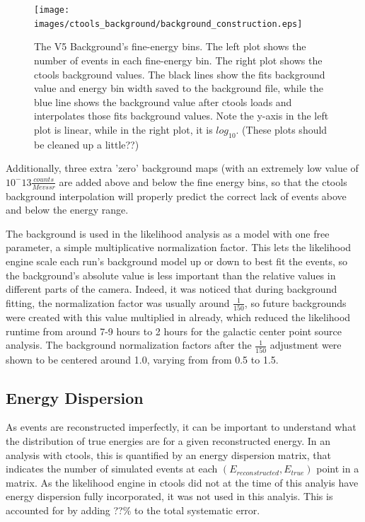 \begin{figure}[ht]
  \begin{center}
    \texttt{[image: images/ctools\_background/background\_construction.eps]}
    \caption[CTOOLS Background Fine Energy Bins]{The V5 Background's fine-energy bins.  The left plot shows the number of events in each fine-energy bin.  The right plot shows the ctools background values.  The black lines show the fits background value and energy bin width saved to the background file, while the blue line shows the background value after ctools loads and interpolates those fits background values.  Note the y-axis in the left plot is linear, while in the right plot, it is $log_{10}$. (These plots should be cleaned up a little??)}\label{fig:background_profile}
  \end{center}
\end{figure}

Additionally, three extra 'zero' background maps (with an extremely low value of $10^-13 \frac{counts}{Mev s sr}$ are added above and below the fine energy bins, so that the ctools background interpolation will properly predict the correct lack of events above and below the energy range.

The background is used in the likelihood analysis as a model with one free parameter, a simple multiplicative normalization factor.
This lets the likelihood engine scale each run's background model up or down to best fit the events, so the background's absolute value is less important than the relative values in different parts of the camera.
Indeed, it was noticed that during background fitting, the normalization factor was usually around $\frac{1}{150}$, so future backgrounds were created with this value multiplied in already, which reduced the likelihood runtime from around 7-9 hours to 2 hours for the galactic center point source analysis.
The background normalization factors after the $\frac{1}{150}$ adjustment were shown to be centered around 1.0, varying from from 0.5 to 1.5.


\subsection{Energy Dispersion}
As events are reconstructed imperfectly, it can be important to understand what the distribution of true energies are for a given reconstructed energy.
In an analysis with ctools, this is quantified by an energy dispersion matrix, that indicates the number of simulated events at each $(E_{reconstructed},E_{true})$ point in a matrix.
As the likelihood engine in ctools did not at the time of this analyis have energy dispersion fully incorporated, it was not used in this analyis.
This is accounted for by adding ??\% to the total systematic error.



